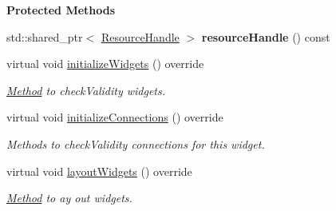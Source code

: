 \begin{Indent}\textbf{ Protected Methods}\par
\begin{DoxyCompactItemize}
\item 
\mbox{\label{classrev_1_1_view_1_1_resource_json_widget_abc3a703617956a59548319de976dc207}} 
std\+::shared\+\_\+ptr$<$ \mbox{\hyperlink{classrev_1_1_resource_handle}{Resource\+Handle}} $>$ {\bfseries resource\+Handle} () const
\item 
\mbox{\label{classrev_1_1_view_1_1_resource_json_widget_a1db80965216735b2a4cacb71449d46d1}} 
virtual void \mbox{\hyperlink{classrev_1_1_view_1_1_resource_json_widget_a1db80965216735b2a4cacb71449d46d1}{initialize\+Widgets}} () override
\begin{DoxyCompactList}\small\item\em \mbox{\hyperlink{struct_method}{Method}} to check\+Validity widgets. \end{DoxyCompactList}\item 
\mbox{\label{classrev_1_1_view_1_1_resource_json_widget_a5ec531752761cd10e78bf68a7d3104c5}} 
virtual void \mbox{\hyperlink{classrev_1_1_view_1_1_resource_json_widget_a5ec531752761cd10e78bf68a7d3104c5}{initialize\+Connections}} () override
\begin{DoxyCompactList}\small\item\em Methods to check\+Validity connections for this widget. \end{DoxyCompactList}\item 
\mbox{\label{classrev_1_1_view_1_1_resource_json_widget_a0bee48c697624331be75efae81ed5986}} 
virtual void \mbox{\hyperlink{classrev_1_1_view_1_1_resource_json_widget_a0bee48c697624331be75efae81ed5986}{layout\+Widgets}} () override
\begin{DoxyCompactList}\small\item\em \mbox{\hyperlink{struct_method}{Method}} to ay out widgets. \end{DoxyCompactList}\end{DoxyCompactItemize}
\end{Indent}

